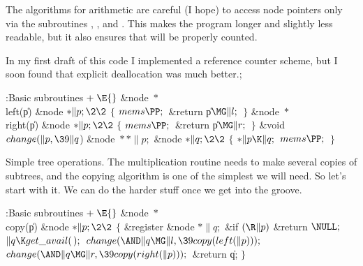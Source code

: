 The algorithms for arithmetic are careful (I hope) to access
node
pointers only via the subroutines , , and . This
makes the program longer and slightly less readable, but it also
ensures that  will be properly counted.

In my first draft of this code I implemented a reference counter scheme,
but I soon found that explicit deallocation was much better.;

\Y\B\4:Basic subroutines\X${}\mathrel+\E{}$\6
\&{node} ${}{*}{}$\\{left}(\|p)\1\1\6
\&{node} ${}{*}\|p;\2\2{}$\6
${}\{{}$\1\6
${}\\{mems}\PP;{}$\6
\&{return} \|p${}\MG\|l;{}$\6
\4${}\}{}$\2\7
\&{node} ${}{*}{}$\\{right}(\|p)\1\1\6
\&{node} ${}{*}\|p;\2\2{}$\6
${}\{{}$\1\6
${}\\{mems}\PP;{}$\6
\&{return} \|p${}\MG\|r;{}$\6
\4${}\}{}$\2\7
\&{void} ${}\\{change}(\|p,\39\|q{}$)\1\1\6
\&{node} ${}{*}{*}\|p;{}$\6
\&{node} ${}{*}\|q;\2\2{}$\6
${}\{{}$\1\6
${}{*}\|p\K\|q;{}$\6
${}\\{mems}\PP;{}$\6
\4${}\}{}$\2\par
\fi

Simple tree operations. The multiplication routine needs
to make several
copies of subtrees, and the copying algorithm is one of the simplest we
will need. So let's start with it. We can do the harder stuff once we
get into the groove.

\Y\B\4:Basic subroutines\X${}\mathrel+\E{}$\6
\&{node} ${}{*}{}$\\{copy}(\|p)\1\1\6
\&{node} ${}{*}\|p;\2\2{}$\6
${}\{{}$\1\6
\&{register} \&{node} ${}{*}\|q;{}$\7
\&{if} ${}(\R\|p){}$\1\5
\&{return} ${}\NULL;{}$\2\6
${}\|q\K\\{get\_avail}(\,);{}$\6
${}\\{change}({\AND}\|q\MG\|l,\39\\{copy}(\\{left}(\|p)));{}$\6
${}\\{change}({\AND}\|q\MG\|r,\39\\{copy}(\\{right}(\|p)));{}$\6
\&{return} \|q;\6
\4${}\}{}$\2\par
\fi

